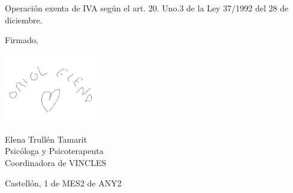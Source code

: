 \documentclass[11pt,a4paper]{article}
\begin{document}
Operación exenta de IVA según el art. 20. Uno.3 de la Ley 37/1992 del 28 de diciembre.

\vspace{0.5cm}

Firmado,

\includegraphics[width=0.3\textwidth]{firma.png}

Elena Trullén Tamarit\\
Psicóloga y Psicoterapeuta\\
Coordinadora de VINCLES

\vspace{0.5cm}

\begin{flushright}
	Castellón, 1 de {MES2} de {ANY2}
\end{flushright}
\end{document}
